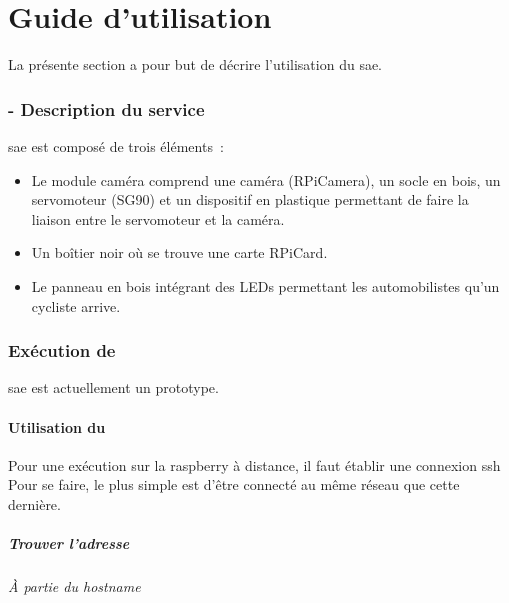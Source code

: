 \part{Guide d'utilisation}
La présente section a pour but de décrire l'utilisation du \gls{sae}.

\section{ - Description du service}
\label{sec:description_clearWay}

\gls{sae} est composé de trois éléments :
\begin{itemize}
    \item Le module caméra comprend une caméra (\gls{RPiCamera}), un socle en bois, un servomoteur (\gls{SG90})
          et un dispositif en plastique permettant de faire la liaison entre le servomoteur et la caméra.
    \item Un boîtier noir où se trouve une carte \gls{RPiCard}.
    \item Le panneau en bois intégrant des LEDs permettant les automobilistes qu'un cycliste arrive.
\end{itemize}

\section{Exécution de }
\label{sec:execution_clearWay}

\gls{sae} est actuellement un prototype.

\subsection{Utilisation du }
\label{sec:utilisationSSH}

Pour une exécution sur la \gls{raspberry} à distance, il faut établir une connexion \gls{ssh}
Pour se faire, le plus simple est d'être connecté au même réseau que cette dernière.

\subsubsection{Trouver l'adresse }

\paragraph{À partie du \textit{hostname}}

